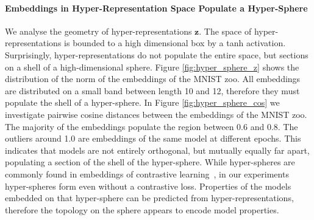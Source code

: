 \paragraph{Embeddings in Hyper-Representation Space Populate a Hyper-Sphere}
We analyse the geometry of hyper-representations $\mathbf{z}$. 
The space of hyper-representations is bounded to a high dimensional box by a tanh activation. Surprisingly, hyper-representations do not populate the entire space, but sections on a shell of a high-dimensional sphere.
Figure \ref{fig:hyper_sphere_z} shows the distribution of the norm of the embeddings of the MNIST zoo. 
All embeddings are distributed on a small band between length 10 and 12, therefore they must populate the shell of a hyper-sphere.
In Figure \ref{fig:hyper_sphere_cos} we investigate pairwise cosine distances between the embeddings of the MNIST zoo. The majority of the embeddings populate the region between 0.6 and 0.8. 
The outliers around 1.0 are embeddings of the same model at different epochs. 
This indicates that models are not entirely orthogonal, but mutually equally far apart, populating a section of the shell of the hyper-sphere. 
While hyper-spheres are commonly found in embeddings of contrastive  learning~\citep{jingUnderstandingDimensionalCollapse2021}, in our experiments hyper-spheres form even without a contrastive loss. Properties of the models embedded on that hyper-sphere can be predicted from hyper-representations, therefore the topology on the sphere appears to encode model properties. 
